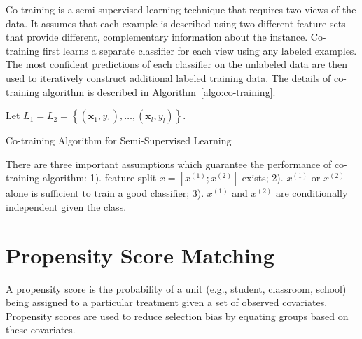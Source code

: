 \documentclass{article}
\begin{document}
Co-training \cite{blum1998combining} is a semi-supervised learning technique that requires two
views of the data. It assumes that each example is described using two
different feature sets that provide different, complementary
information about the instance. Co-training first learns a separate
classifier for each view using any labeled examples. The most
confident predictions of each classifier on the unlabeled data are
then used to iteratively construct additional labeled training
data. The details of co-training algorithm is described in Algorithm~\ref{algo:co-training}.
\begin{algorithm}[h] \label{algo:co-training}
Let $L_1 = L_2 = \left \{ (\mathbf{x}_1, y_1), \ldots, (\mathbf{x}_l, y_l)
\right \}.$ \\

\caption{Co-training Algorithm for Semi-Supervised Learning}
\end{algorithm}

There are three important assumptions which guarantee the performance of
co-training algorithm: 1). feature split $x=[x^{(1)};x^{(2)}]$
exists; 2). $x^{(1)}$ or $x^{(2)}$ alone is sufficient to train a good
classifier; 3). $x^{(1)}$ and $x^{(2)}$ are conditionally independent
given the class.

\section{Propensity Score Matching}
A propensity score \cite{rosenbaum1983central} is the probability of a unit (e.g., student,
classroom, school) being assigned to a particular treatment given a
set of observed covariates. Propensity scores are used to reduce
selection bias by equating groups based on these covariates.
\end{document}
